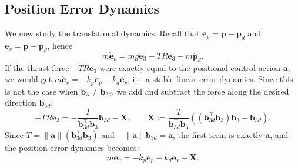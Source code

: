 \documentclass[10pt, a4paper]{report}
\begin{document}
\subsection{Position Error Dynamics}
We now study the translational dynamics. Recall that $\mathbf e_p=\mathbf p-\mathbf p_d$ and $\mathbf e_v=\dot{\mathbf p}-\dot{\mathbf p}_d$, hence\begin{equation}
    m\dot{\mathbf e}_v=mg\mathbf e_3-TR\mathbf e_3-m\ddot{\mathbf p}_d.
\end{equation}
If the thrust force $-TR\mathbf e_3$ were exactly equal to the positional control action $\mathbf a$, we would get $m\dot{\mathbf e}_v=-k_p\mathbf e_p-k_d\mathbf e_v$, i.e. a stable linear error dynamics. Since this is not the case when $\mathbf b_3\ne\mathbf b_{3d}$, we add and subtract the force along the desired direction $\mathbf b_{3d}$:\begin{equation}
    -TR\mathbf e_3=-\frac{T}{\mathbf b_{3d}^\top\mathbf b_3}\mathbf b_{3d}-\mathbf X,\quad\quad
    \mathbf X:=\frac{T}{\mathbf b_{3d}^\top\mathbf b_3}\left((\mathbf b_{3d}^\top\mathbf b_3)\mathbf b_3-\mathbf b_{3d}\right).
\end{equation}
Since $T=\|\mathbf a\|(\mathbf b_{3d}^\top\mathbf b_3)$ and $-\|\mathbf a\|\mathbf b_{3d}=\mathbf a$, the first term is exactly $\mathbf a$, and the position error dynamics becomes:\begin{equation}\label{position_error_dynamics}
    m\dot{\mathbf e}_v=-k_p\mathbf e_p-k_d\mathbf e_v-\mathbf X.
\end{equation}
\end{document}
